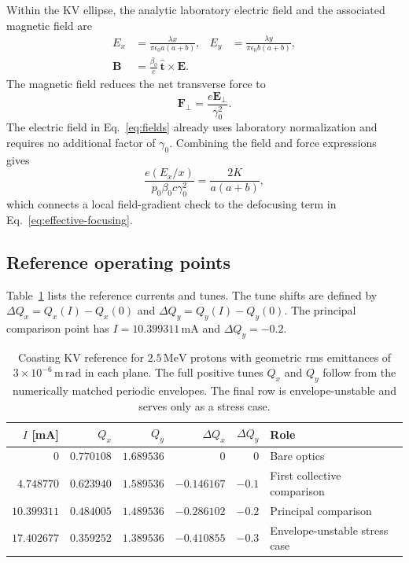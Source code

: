 \documentclass[11pt,a4paper]{article}
\numberwithin{equation}{section}
\newcommand{\units}[1]{\,\mathrm{#1}}
\begin{document}
Within the KV ellipse, the analytic laboratory electric field and the
associated magnetic field are
\begin{equation}
  \begin{aligned}
    E_x&=\frac{\lambda x}{\pi\epsilon_0a(a+b)},&
    E_y&=\frac{\lambda y}{\pi\epsilon_0b(a+b)},\\
    \mathbf B&=\frac{\beta_0}{c}\,\hat{\mathbf t}\times\mathbf E.
  \end{aligned}
  \label{eq:fields}
\end{equation}
The magnetic field reduces the net transverse force to
\begin{equation}
  \mathbf F_\perp=\frac{e\mathbf E_\perp}{\gamma_0^2}.
  \label{eq:force}
\end{equation}
The electric field in Eq.~\eqref{eq:fields} already uses laboratory
normalization and requires no additional factor of $\gamma_0$. Combining
the field and force expressions gives
\begin{equation}
  \frac{e(E_x/x)}{p_0\beta_0c\gamma_0^2}
     =\frac{2K}{a(a+b)},
  \label{eq:force-gradient}
\end{equation}
which connects a local field-gradient check to the defocusing term in
Eq.~\eqref{eq:effective-focusing}.

\subsection{Reference operating points}

Table~\ref{tab:operating-points} lists the reference currents and tunes.
The tune shifts are defined by $\Delta Q_x=Q_x(I)-Q_x(0)$ and
$\Delta Q_y=Q_y(I)-Q_y(0)$. The principal comparison point has
$I=10.399311\units{mA}$ and $\Delta Q_y=-0.2$.

\begin{table}[htbp]
  \centering
  \caption{Coasting KV reference for $2.5\units{MeV}$ protons with
  geometric rms emittances of $3\times10^{-6}\units{m\,rad}$ in each
  plane. The full positive tunes $Q_x$ and $Q_y$ follow from the
  numerically matched periodic envelopes. The final row is
  envelope-unstable and serves only as a stress case.}
  \label{tab:operating-points}
  \small
  \setlength{\tabcolsep}{5pt}
  \begin{tabularx}{\linewidth}{rrrrr>{\raggedright\arraybackslash}X}
    \toprule
    $I$ [mA] & $Q_x$ & $Q_y$ & $\Delta Q_x$ & $\Delta Q_y$ & Role\\
    \midrule
    $0$ & $0.770108$ & $1.689536$ & $0$ & $0$ & Bare optics\\
    $4.748770$ & $0.623940$ & $1.589536$ & $-0.146167$ & $-0.1$
      & First collective comparison\\
    $10.399311$ & $0.484005$ & $1.489536$ & $-0.286102$ & $-0.2$
      & Principal comparison\\
    $17.402677$ & $0.359252$ & $1.389536$ & $-0.410855$ & $-0.3$
      & Envelope-unstable stress case\\
    \bottomrule
  \end{tabularx}
\end{table}
\end{document}
